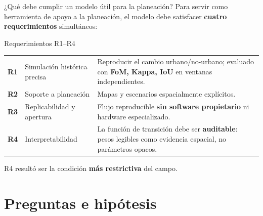 \documentclass[aspectratio=169,11pt]{beamer}
\newcommand{\highlight}[1]{\textcolor{UNAMBlue}{\textbf{#1}}}
\begin{document}
\begin{frame}{¿Qué debe cumplir un modelo útil para la planeación?}
  \small
  Para servir como herramienta de apoyo a la planeación, el modelo debe satisfacer \highlight{cuatro requerimientos} simultáneos:
  \vspace{0.2cm}
  \begin{block}{Requerimientos R1--R4}
  \begin{tabularx}{\linewidth}{@{}p{0.7cm}>{\raggedright\arraybackslash}p{3.3cm}X@{}}
    \textbf{R1} & Simulación histórica precisa & Reproducir el cambio urbano/no-urbano; evaluado con \textbf{FoM, Kappa, IoU} en ventanas independientes. \\[2pt]
    \textbf{R2} & Soporte a planeación & Mapas y escenarios espacialmente explícitos. \\[2pt]
    \textbf{R3} & Replicabilidad y apertura & Flujo reproducible \textbf{sin software propietario} ni hardware especializado. \\[2pt]
    \textbf{R4} & Interpretabilidad & La función de transición debe ser \textbf{auditable}: pesos legibles como evidencia espacial, no parámetros opacos. \\
  \end{tabularx}
  \end{block}
  \centering\footnotesize R4 resultó ser la condición \highlight{más restrictiva} del campo.
\end{frame}

\section{Preguntas e hipótesis}
\end{document}
